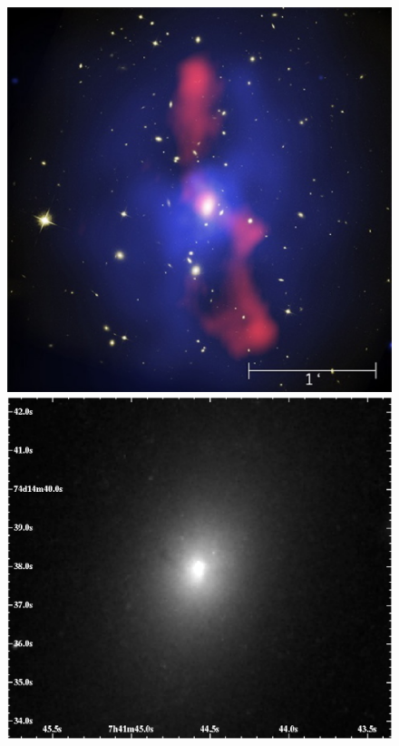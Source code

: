 \documentclass[12pt]{article}
\begin{document}
\begin{figure}[ht]
  \begin{center}
    \begin{minipage}{0.47\linewidth}    
      \includegraphics*[width=\textwidth]{fig1}
    \end{minipage}
    \begin{minipage}{0.52\linewidth}    
      \includegraphics*[width=\textwidth]{fig4a}

\end{minipage}
\end{center}
\end{figure}
\end{document}
